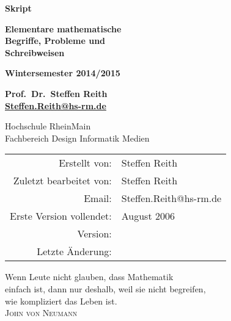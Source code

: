 \documentclass[11pt, a4paper, twoside, bibliography=totoc]{scrartcl}
\makeatletter
\newcommand{\docutyp}{Skript}
\newcommand{\lecture}{Elementare mathematische\\ Begriffe, Probleme und\\[0.5\bigskipamount] Schreibweisen}
\newcommand{\docudate}{Wintersemester 2014/2015}
\newcommand{\institution}{{\Large Hochschule RheinMain}\\
                          Fachbereich Design Informatik Medien}
\newcommand{\lecturer}{Prof.~Dr.~Steffen Reith}
\newcommand{\lectureremail}{\href{mailto:Steffen.Reith@hs-rm.de}{Steffen.Reith@hs-rm.de}}
\newcommand{\writer}{Steffen Reith}
\newcommand{\reviser}{Steffen Reith}
\newcommand{\email}{Steffen.Reith@hs-rm.de}
\newcommand{\writtendate}{August 2006}
\makeatother
\begin{document}
\pagestyle{scrplain}

\begin{titlepage}

        \vspace{40pt}
	\begin{center}

		\vspace{20pt}
		\textbf{\Large {\docutyp}}
			
		\vspace{20pt}
		\textbf{\Huge \lecture}
			
		\vspace{20pt}
		\textbf{\docudate}

		\vspace{20pt}
		\textbf{\lecturer}\\
		\textbf{\lectureremail}
		
		\vspace{120pt}
		{\institution}\\
		
		\vfill			
		\vspace{20pt}
		\begin{tabular}[t]{rl}
			Erstellt von: & {\writer}\\
                        Zuletzt bearbeitet von: & {\reviser}\\
			Email: & {\email}\\
			Erste Version vollendet: & {\writtendate}\\
			Version: & {\svnInfoRevision}\\
			Letzte Änderung: & {\svnInfoDate}\\
		\end{tabular}
	\end{center}
	\newpage
\end{titlepage}

\cleardoublepage

\vspace{0.3\textheight} 
\begin{raggedleft}
Wenn Leute nicht glauben, dass Mathematik\\
einfach ist, dann nur deshalb, weil sie nicht begreifen,\\
wie kompliziert das Leben ist.\\[\smallskipamount]
\hfill \textsc{John von Neumann}%
\end{raggedleft}
\end{document}
